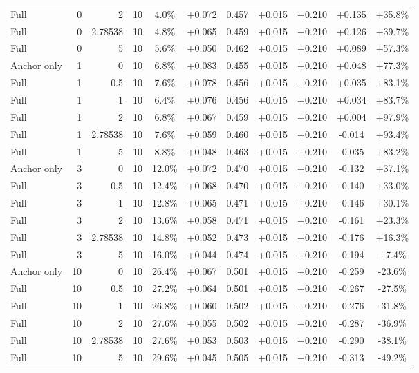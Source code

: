 \begin{table}[htbp]
\begin{tabular}{lrrrccccccc}
Full & 0 & 2 & 10 & 4.0\% & +0.072 & 0.457 & +0.015 & +0.210 & +0.135 & +35.8\% \\
Full & 0 & 2.78538 & 10 & 4.8\% & +0.065 & 0.459 & +0.015 & +0.210 & +0.126 & +39.7\% \\
Full & 0 & 5 & 10 & 5.6\% & +0.050 & 0.462 & +0.015 & +0.210 & +0.089 & +57.3\% \\
Anchor only & 1 & 0 & 10 & 6.8\% & +0.083 & 0.455 & +0.015 & +0.210 & +0.048 & +77.3\% \\
Full & 1 & 0.5 & 10 & 7.6\% & +0.078 & 0.456 & +0.015 & +0.210 & +0.035 & +83.1\% \\
Full & 1 & 1 & 10 & 6.4\% & +0.076 & 0.456 & +0.015 & +0.210 & +0.034 & +83.7\% \\
Full & 1 & 2 & 10 & 6.8\% & +0.067 & 0.459 & +0.015 & +0.210 & +0.004 & +97.9\% \\
Full & 1 & 2.78538 & 10 & 7.6\% & +0.059 & 0.460 & +0.015 & +0.210 & -0.014 & +93.4\% \\
Full & 1 & 5 & 10 & 8.8\% & +0.048 & 0.463 & +0.015 & +0.210 & -0.035 & +83.2\% \\
Anchor only & 3 & 0 & 10 & 12.0\% & +0.072 & 0.470 & +0.015 & +0.210 & -0.132 & +37.1\% \\
Full & 3 & 0.5 & 10 & 12.4\% & +0.068 & 0.470 & +0.015 & +0.210 & -0.140 & +33.0\% \\
Full & 3 & 1 & 10 & 12.8\% & +0.065 & 0.471 & +0.015 & +0.210 & -0.146 & +30.1\% \\
Full & 3 & 2 & 10 & 13.6\% & +0.058 & 0.471 & +0.015 & +0.210 & -0.161 & +23.3\% \\
Full & 3 & 2.78538 & 10 & 14.8\% & +0.052 & 0.473 & +0.015 & +0.210 & -0.176 & +16.3\% \\
Full & 3 & 5 & 10 & 16.0\% & +0.044 & 0.474 & +0.015 & +0.210 & -0.194 & +7.4\% \\
Anchor only & 10 & 0 & 10 & 26.4\% & +0.067 & 0.501 & +0.015 & +0.210 & -0.259 & -23.6\% \\
Full & 10 & 0.5 & 10 & 27.2\% & +0.064 & 0.501 & +0.015 & +0.210 & -0.267 & -27.5\% \\
Full & 10 & 1 & 10 & 26.8\% & +0.060 & 0.502 & +0.015 & +0.210 & -0.276 & -31.8\% \\
Full & 10 & 2 & 10 & 27.6\% & +0.055 & 0.502 & +0.015 & +0.210 & -0.287 & -36.9\% \\
Full & 10 & 2.78538 & 10 & 27.6\% & +0.053 & 0.503 & +0.015 & +0.210 & -0.290 & -38.1\% \\
Full & 10 & 5 & 10 & 29.6\% & +0.045 & 0.505 & +0.015 & +0.210 & -0.313 & -49.2\% \\

\end{tabular}
\end{table}
